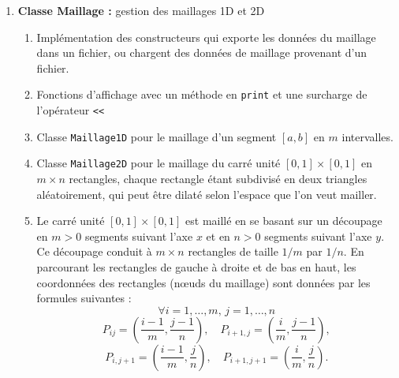 \documentclass{article}
\begin{document}
\begin{enumerate}[label=\arabic*]
        \item \textbf{Classe Maillage :} gestion des maillages 1D et 2D
        \begin{enumerate}[label=\alph*.]
            \item Implémentation des constructeurs qui exporte les données du maillage dans un fichier, ou chargent des données de maillage provenant d'un fichier.
            \item Fonctions d'affichage avec un méthode en \texttt{print} et une surcharge de l'opérateur \texttt{<<}
            \item Classe \texttt{Maillage1D} pour le maillage d'un segment \([a, b]\) en \(m\) intervalles.
            \item Classe \texttt{Maillage2D} pour le maillage du carré unité \([0, 1] \times [0, 1]\) en \(m \times n\) rectangles, chaque rectangle étant subdivisé en deux triangles aléatoirement, qui peut être dilaté selon l'espace que l'on veut mailler.
            \item Le carré unité $[0, 1] \times [0, 1]$ est maillé en se basant sur un découpage en $m > 0$ segments suivant l'axe $x$ et en $n > 0$ segments suivant l'axe $y$. Ce découpage conduit à $m \times n$ rectangles de taille $1/m$ par $1/n$. En parcourant les rectangles de gauche à droite et de bas en haut, les coordonnées des rectangles (nœuds du maillage) sont données par les formules suivantes :
                \[
                \forall i = 1, \ldots, m, \, j = 1, \ldots, n
                \]
                \[
                P_{ij} = \left( \frac{i-1}{m}, \frac{j-1}{n} \right), \quad 
                P_{i+1,j} = \left( \frac{i}{m}, \frac{j-1}{n} \right),
                \]
                \[
                P_{i,j+1} = \left( \frac{i-1}{m}, \frac{j}{n} \right), \quad 
                P_{i+1,j+1} = \left( \frac{i}{m}, \frac{j}{n} \right).
                \]
                \begin{figure}[H]
                    \centering
\end{figure}
\end{enumerate}
\end{enumerate}
\end{document}
